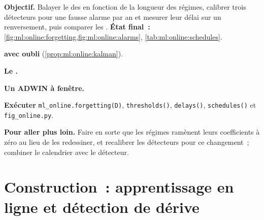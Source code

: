 \begin{tutorial}
\textbf{Objectif.} Balayer le  des  en fonction de la longueur des régimes, calibrer trois détecteurs
pour une fausse alarme par an et mesurer leur délai sur un renversement, puis comparer les . \textbf{État final~:}
\cref{fig:ml:online:forgetting,fig:ml:online:alarms}, \cref{tab:ml:online:schedules}.
\begin{tutsteps}
\item \textbf{ avec oubli} (\cref{prop:ml:online:kalman}).
\label{lst:ml:online:rls}
\item \textbf{Le .}
\label{lst:ml:online:ph}
\item \textbf{Un ADWIN à fenêtre.}
\label{lst:ml:online:adwin}
\item \textbf{Exécuter} \texttt{ml\_online.forgetting(D)}, \texttt{thresholds()}, \texttt{delays()}, \texttt{schedules()} et
\texttt{fig\_online.py}.
\end{tutsteps}
\textbf{Pour aller plus loin.} Faire en sorte que les régimes ramènent leurs coefficients à zéro au lieu de les redessiner, et recalibrer les
détecteurs pour ce changement~; combiner le calendrier avec le détecteur.
\end{tutorial}

\section{Construction~: apprentissage en ligne et détection de dérive}\label{bld:ml:online-learning-and-drift:onlinelearn}

